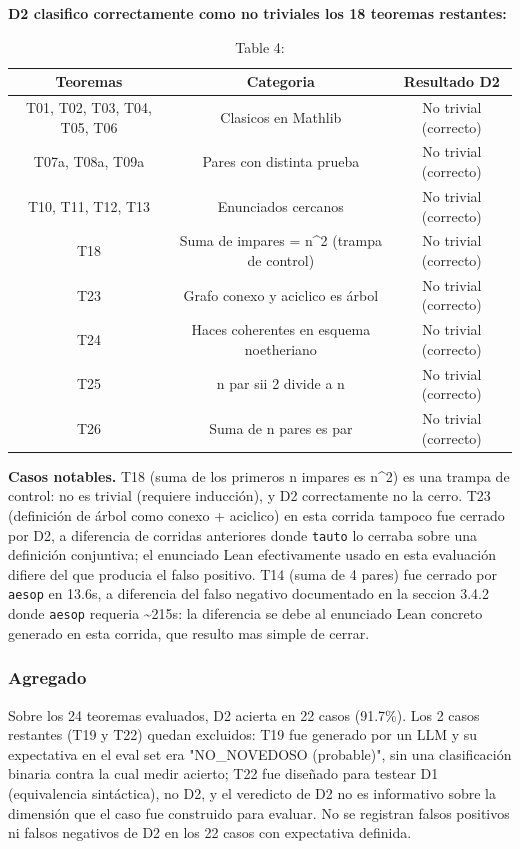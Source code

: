 \documentclass[12pt,a4paper]{article}
\theoremstyle{remark}
\begin{document}
\textbf{D2 clasifico correctamente como no triviales los 18 teoremas restantes:}

\begin{table}[htbp]
\centering
\begin{tabular}{|c|c|c|}
\hline
Teoremas & Categoria & Resultado D2 \\
\hline
T01, T02, T03, T04, T05, T06 & Clasicos en Mathlib & No trivial (correcto) \\
T07a, T08a, T09a & Pares con distinta prueba & No trivial (correcto) \\
T10, T11, T12, T13 & Enunciados cercanos & No trivial (correcto) \\
T18 & Suma de impares = n\textasciicircum{}2 (trampa de control) & No trivial (correcto) \\
T23 & Grafo conexo y aciclico es árbol & No trivial (correcto) \\
T24 & Haces coherentes en esquema noetheriano & No trivial (correcto) \\
T25 & n par sii 2 divide a n & No trivial (correcto) \\
T26 & Suma de n pares es par & No trivial (correcto) \\
\hline
\end{tabular}
\caption{Table 4: }
\label{tab:4}
\end{table}


\textbf{Casos notables.} T18 (suma de los primeros n impares es n\textasciicircum{}2) es una trampa de control: no es trivial (requiere inducción), y D2 correctamente no la cerro. T23 (definición de árbol como conexo + aciclico) en esta corrida tampoco fue cerrado por D2, a diferencia de corridas anteriores donde \texttt{tauto} lo cerraba sobre una definición conjuntiva; el enunciado Lean efectivamente usado en esta evaluación difiere del que producia el falso positivo. T14 (suma de 4 pares) fue cerrado por \texttt{aesop} en 13.6s, a diferencia del falso negativo documentado en la seccion 3.4.2 donde \texttt{aesop} requeria \textasciitilde{}215s: la diferencia se debe al enunciado Lean concreto generado en esta corrida, que resulto mas simple de cerrar.

\subsubsection{Agregado}

Sobre los 24 teoremas evaluados, D2 acierta en 22 casos (91.7\%). Los 2 casos restantes (T19 y T22) quedan excluidos: T19 fue generado por un LLM y su expectativa en el eval set era "NO\_NOVEDOSO (probable)", sin una clasificación binaria contra la cual medir acierto; T22 fue diseñado para testear D1 (equivalencia sintáctica), no D2, y el veredicto de D2 no es informativo sobre la dimensión que el caso fue construido para evaluar. No se registran falsos positivos ni falsos negativos de D2 en los 22 casos con expectativa definida.
\end{document}

